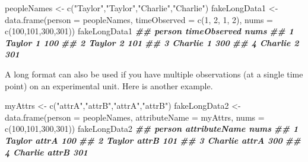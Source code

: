 \documentclass[
  12pt,
  krantz2]{krantz}
\makeatletter
\newenvironment{Shaded}{\begin{snugshade}}{\end{snugshade}}
\newcommand{\AttributeTok}[1]{\textcolor[rgb]{0.61,0.61,0.61}{#1}}
\newcommand{\DecValTok}[1]{\textcolor[rgb]{0.06,0.06,0.06}{#1}}
\newcommand{\DocumentationTok}[1]{\textcolor[rgb]{0.37,0.37,0.37}{\textbf{\textit{#1}}}}
\newcommand{\FunctionTok}[1]{\textcolor[rgb]{0,0,0}{#1}}
\newcommand{\NormalTok}[1]{#1}
\newcommand{\OtherTok}[1]{\textcolor[rgb]{0.37,0.37,0.37}{#1}}
\newcommand{\StringTok}[1]{\textcolor[rgb]{0.5,0.5,0.5}{#1}}
\newenvironment{kframe}{%
\medskip{}
\setlength{\fboxsep}{.8em}
 \def\at@end@of@kframe{}%
 \ifinner\ifhmode%
  \def\at@end@of@kframe{\end{minipage}}%
  \begin{minipage}{\columnwidth}%
 \fi\fi%
 \def\FrameCommand##1{\hskip\@totalleftmargin \hskip-\fboxsep
 \colorbox{shadecolor}{##1}\hskip-\fboxsep
     \hskip-\linewidth \hskip-\@totalleftmargin \hskip\columnwidth}%
 \MakeFramed {\advance\hsize-\width
   \@totalleftmargin\z@ \linewidth\hsize
   \@setminipage}}%
 {\par\unskip\endMakeFramed%
 \at@end@of@kframe}
\renewenvironment{Shaded}{\begin{kframe}}{\end{kframe}}
\makeatother
\begin{document}
\begin{Shaded}
\begin{Highlighting}[]
\NormalTok{peopleNames }\OtherTok{\textless{}{-}} \FunctionTok{c}\NormalTok{(}\StringTok{"Taylor"}\NormalTok{,}\StringTok{"Taylor"}\NormalTok{,}\StringTok{"Charlie"}\NormalTok{,}\StringTok{"Charlie"}\NormalTok{)}
\NormalTok{fakeLongData1 }\OtherTok{\textless{}{-}} \FunctionTok{data.frame}\NormalTok{(}\AttributeTok{person =}\NormalTok{ peopleNames, }
                             \AttributeTok{timeObserved =} \FunctionTok{c}\NormalTok{(}\DecValTok{1}\NormalTok{, }\DecValTok{2}\NormalTok{, }\DecValTok{1}\NormalTok{, }\DecValTok{2}\NormalTok{),}
                             \AttributeTok{nums =} \FunctionTok{c}\NormalTok{(}\DecValTok{100}\NormalTok{,}\DecValTok{101}\NormalTok{,}\DecValTok{300}\NormalTok{,}\DecValTok{301}\NormalTok{))}
\NormalTok{fakeLongData1}
\DocumentationTok{\#\#    person timeObserved nums}
\DocumentationTok{\#\# 1  Taylor            1  100}
\DocumentationTok{\#\# 2  Taylor            2  101}
\DocumentationTok{\#\# 3 Charlie            1  300}
\DocumentationTok{\#\# 4 Charlie            2  301}
\end{Highlighting}
\end{Shaded}

A long format can also be used if you have multiple observations (at a single time point) on an experimental unit. Here is another example.

\begin{Shaded}
\begin{Highlighting}[]
\NormalTok{myAttrs }\OtherTok{\textless{}{-}} \FunctionTok{c}\NormalTok{(}\StringTok{"attrA"}\NormalTok{,}\StringTok{"attrB"}\NormalTok{,}\StringTok{"attrA"}\NormalTok{,}\StringTok{"attrB"}\NormalTok{)}
\NormalTok{fakeLongData2 }\OtherTok{\textless{}{-}} \FunctionTok{data.frame}\NormalTok{(}\AttributeTok{person =}\NormalTok{ peopleNames, }
                             \AttributeTok{attributeName =}\NormalTok{ myAttrs,}
                             \AttributeTok{nums =} \FunctionTok{c}\NormalTok{(}\DecValTok{100}\NormalTok{,}\DecValTok{101}\NormalTok{,}\DecValTok{300}\NormalTok{,}\DecValTok{301}\NormalTok{))}
\NormalTok{fakeLongData2}
\DocumentationTok{\#\#    person attributeName nums}
\DocumentationTok{\#\# 1  Taylor         attrA  100}
\DocumentationTok{\#\# 2  Taylor         attrB  101}
\DocumentationTok{\#\# 3 Charlie         attrA  300}
\DocumentationTok{\#\# 4 Charlie         attrB  301}
\end{Highlighting}
\end{Shaded}
\end{document}
